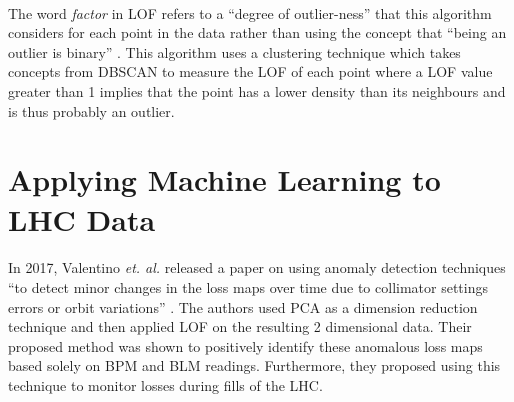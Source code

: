 \paragraph{ }The word \textit{factor} in \acs{LOF} refers to a ``degree of outlier-ness'' that this algorithm considers for each point in the data rather than using the concept that ``being an outlier is binary'' \cite{Breunig2000}. This algorithm uses a clustering technique which takes concepts from \acs{DBSCAN} to measure the \acs{LOF} of each point where a \acs{LOF} value greater than 1 implies that the point has a lower density than its neighbours and is thus probably an outlier.

\section{Applying Machine Learning to LHC Data}

\paragraph{ }In 2017, Valentino \textit{et. al.} released a paper on using anomaly detection techniques ``to detect minor changes in the loss maps over time due to collimator settings errors or orbit variations'' \cite{Valentino2017}. The authors used \acs{PCA} as a dimension reduction technique and then applied \acs{LOF} on the resulting 2 dimensional data. Their proposed method was shown to positively identify these anomalous loss maps based solely on \acs{BPM} and \acs{BLM} readings. Furthermore, they proposed using this technique to monitor losses during fills of the \acs{LHC}.